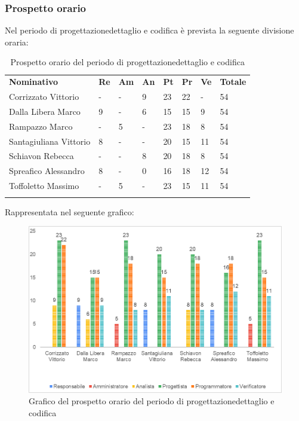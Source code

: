 \subsubsection{Prospetto orario}
Nel periodo di progettazione\glosp dettaglio e codifica è prevista la seguente divisione oraria:
\begin{longtable} {				
		>{}p{40mm}  
		>{}p{8mm}
		>{}p{8mm}
		>{}p{8mm}
		>{}p{8mm}
		>{}p{8mm}
		>{}p{8mm}
		>{}p{12mm}				
	}			
	\rowcolor{gray!50}
	\textbf{Nominativo} & \textbf{Re} & \textbf{Am} & \textbf{An} & \textbf{Pt} & \textbf{Pr} & \textbf{Ve} & \textbf{Totale}	\TBstrut \\ [2mm]
	Corrizzato Vittorio & - & - & 9 & 23 & 22 & - & 54 \TBstrut \\ [2mm]
	Dalla Libera Marco & 9 & - & 6 & 15 & 15 & 9 & 54 \TBstrut \\ [2mm]
	Rampazzo Marco & - & 5 & - & 23 & 18 & 8 & 54 \TBstrut \\ [2mm]
	Santagiuliana Vittorio & 8 & - & - & 20 & 15 & 11 & 54 \TBstrut \\ [2mm]
	Schiavon Rebecca & - & - & 8 & 20 & 18 & 8 & 54 \TBstrut \\ [2mm]
	Spreafico Alessandro & 8 & - & 0 & 16 & 18 & 12 & 54 \TBstrut \\ [2mm]
	Toffoletto Massimo & - & 5 & - & 23 & 15 & 11 & 54 \TBstrut \\ [2mm]
	\rowcolor{white}
	\caption{Prospetto orario del periodo di progettazione\glosp dettaglio e codifica}
\end{longtable}
\pagebreak
Rappresentata nel seguente grafico:
\begin{figure} [H]
	\includegraphics[width=\linewidth]{./img/Grafici/5.png}
	\caption{Grafico del prospetto orario del periodo di progettazione\glosp dettaglio e codifica}
\end{figure}
